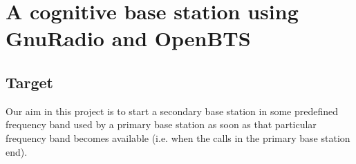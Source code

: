 \chapter{A cognitive base station using GnuRadio and OpenBTS}
\section{Target}
Our aim in this project is to start a secondary base station in some predefined frequency band used by a 
primary base station as soon as that particular frequency band becomes available (i.e. when the calls in 
the primary base station end).
